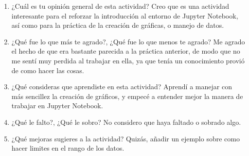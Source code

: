 \documentclass{article}
\begin{document}
\begin{enumerate}
\item ¿Cuál es tu opinión general de esta actividad?
Creo que es una actividad interesante para el reforzar la introducción al entorno de Jupyter Notebook, así como para la práctica de la creación de gráficas, o manejo de datos.

\item ¿Qué fue lo que más te agrado?, ¿Qué fue lo que menos te agrado?
Me agrado el hecho de que era bastante parecida a la práctica anterior, de modo que no me sentí muy perdida al trabajar en ella, ya que tenía un conocimiento provió de como hacer las cosas.

\item ¿Qué consideras que aprendiste en esta actividad?
Aprendí a manejar con más sencillez la creación de gráficos, y empecé a entender mejor la manera de trabajar en Jupyter Notebook.

\item ¿Qué le falto?, ¿Qué le sobro?
No considero que haya faltado o sobrado algo.

\item ¿Qué mejoras sugieres a la actividad?
Quizás, añadir un ejemplo sobre como hacer limites en el rango de los datos.

\end{enumerate}
\end{document}
